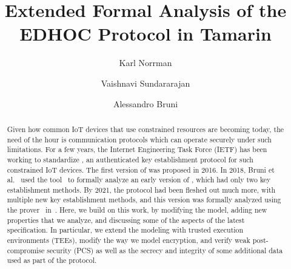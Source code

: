 \documentclass[runningheads]{llncs}
\begin{document}
\title{Extended Formal Analysis of the EDHOC Protocol in Tamarin}
\author{
    Karl Norrman \and
    Vaishnavi Sundararajan \and
    Alessandro Bruni
}

\maketitle
%

\begin{abstract}
Given how common IoT devices that use constrained resources are becoming
today, the need of the hour is communication protocols which can operate
securely under such limitations.
%
For a few years, the Internet Engineering Task Force (IETF) has been working
to standardize \mEdhoc{}, an authenticated key establishment protocol for
such constrained IoT devices.
%
The first version of \mEdhoc{} was proposed in 2016.
%
In 2018, Bruni et al.~\cite{DBLP:conf/secsr/BruniJPS18} used the \mProverif{}
tool~\cite{DBLP:conf/csfw/Blanchet01} to formally analyze an early version of
\mEdhoc{}, which had only two key establishment methods.
%
By 2021, the protocol had been fleshed out much more, with multiple new key
establishment methods, and this version was formally analyzed using the
\mTamarin{} prover~\cite{DBLP:conf/cav/MeierSCB13} in~\cite{Norr21}.
%
Here, we build on this work, by modifying the model, adding new properties
that we analyze, and discussing some of the aspects of the latest \mEdhoc{}
specification. In particular, we extend the modeling with trusted execution
environments (TEEs), modify the way we model \mXor{} encryption, and
verify weak post-compromise security (PCS) as well as the secrecy and
integrity of some additional data used as part of the protocol.

\end{abstract}
%
\end{document}
